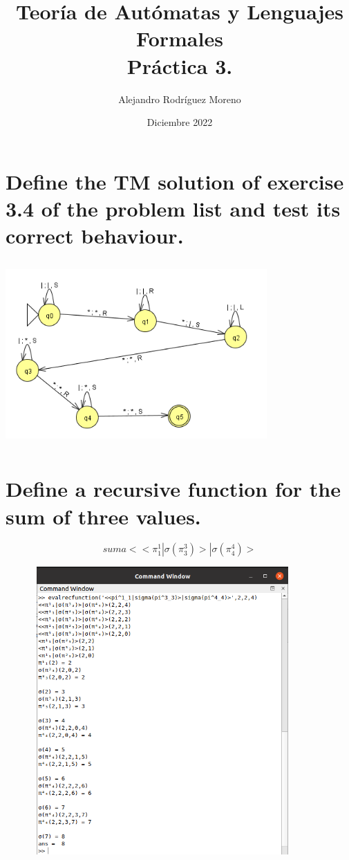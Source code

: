\documentclass{article}
\title{Teoría de Autómatas y Lenguajes Formales\\[.4\baselineskip]Práctica 3.}
\author{Alejandro Rodríguez Moreno}
\date{Diciembre 2022}
\theoremstyle{plain}
\theoremstyle{definition}
\begin{document}
\maketitle

\section{Define the TM solution of exercise 3.4 of the problem list and test its correct behaviour. }

\begin{center} 
\includegraphics[width=10cm, height=7cm]{P3_E1.png}
\end{center}
\section {Define a recursive function for the sum of three values.}

\begin{equation}
suma <<\pi^1_1|\sigma(\pi^3_3)>|\sigma(\pi^4_4)>
\end {equation}


\begin{center}

\includegraphics[width=12cm, height=11cm] {P3_E2.png}
    
\end{center}
\end{document}
